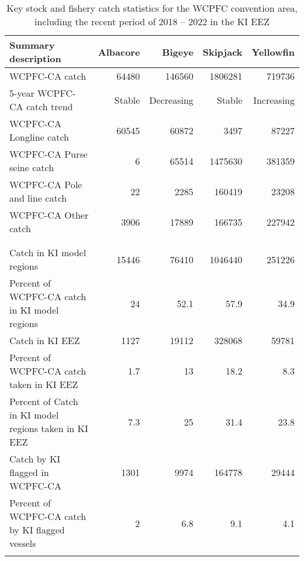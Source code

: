\begin{longtable}{lrrrr}
\caption{Key stock and fishery catch statistics for the WCPFC convention area, including the recent period of 2018 -- 2022 in the KI EEZ} \\ 
  \hline
Summary description & Albacore & Bigeye & Skipjack & Yellowfin \\ 
  \hline
WCPFC-CA catch & 64480 & 146560 & 1806281 & 719736 \\ 
  5-year WCPFC-CA catch trend & Stable & Decreasing & Stable & Increasing \\ 
  WCPFC-CA Longline catch & 60545 & 60872 & 3497 & 87227 \\ 
  WCPFC-CA Purse seine catch & 6 & 65514 & 1475630 & 381359 \\ 
  WCPFC-CA Pole and line catch & 22 & 2285 & 160419 & 23208 \\ 
  WCPFC-CA Other catch & 3906 & 17889 & 166735 & 227942 \\ 
   &  &  &  &  \\ 
   &  &  &  &  \\ 
   \hline
Catch in KI model regions & 15446 & 76410 & 1046440 & 251226 \\ 
  Percent of WCPFC-CA catch in KI model regions & 24 & 52.1 & 57.9 & 34.9 \\ 
  Catch in KI EEZ & 1127 & 19112 & 328068 & 59781 \\ 
  Percent of WCPFC-CA catch taken in KI EEZ & 1.7 & 13 & 18.2 & 8.3 \\ 
  Percent of Catch in KI model regions taken in KI EEZ & 7.3 & 25 & 31.4 & 23.8 \\ 
  Catch by KI flagged in WCPFC-CA & 1301 & 9974 & 164778 & 29444 \\ 
  Percent of WCPFC-CA catch by KI flagged vessels & 2 & 6.8 & 9.1 & 4.1 \\ 
  \hline
\label{cat_sum_tab}
\end{longtable}
